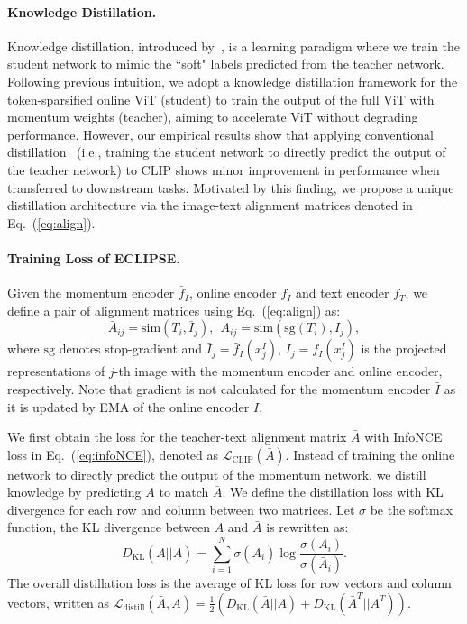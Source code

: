 \paragraph{Knowledge Distillation.}
Knowledge distillation, introduced by~\cite{hinton2015distilling}, is a learning paradigm where we train the student network to mimic the ``soft" labels predicted from the teacher network.
Following previous intuition, we adopt a knowledge distillation framework for the token-sparsified online ViT (student) to train the output of the full ViT with momentum weights (teacher), aiming to accelerate ViT without degrading performance.
However, our empirical results show that applying conventional distillation~\cite{hinton2015distilling,touvron2021training,caron2021emerging} (i.e., training the student network to directly predict the output of the teacher network) to CLIP shows minor improvement in performance when transferred to downstream tasks. %
Motivated by this finding, we propose a unique distillation architecture via the image-text alignment matrices denoted in Eq.~(\ref{eq:align}).

\paragraph{Training Loss of ECLIPSE.}
Given the momentum encoder $\bar{f}_I$, online encoder $f_I$ and text encoder $f_T$, we define a pair of alignment matrices using Eq.~(\ref{eq:align}) as:
\begin{equation}
    \bar{A}_{ij}=\mbox{sim}(T_i, \bar{I}_j), ~~A_{ij}=\mbox{sim}(\text{sg}(T_i), I_j),
\end{equation}
where $\text{sg}$ denotes stop-gradient and $\bar{I}_j=\bar{f}_I(x^I_j)$, $I_j=f_I(x^I_j)$ is the projected representations of $j$-th image with the momentum encoder and online encoder, respectively.
Note that gradient is not calculated for the momentum encoder $\bar{I}$ as it is updated by EMA of the online encoder $I$.

We first obtain the loss for the teacher-text alignment matrix $\bar{A}$ with InfoNCE loss in Eq.~(\ref{eq:infoNCE}), denoted as $\mathcal{L}_{\text{CLIP}}(\bar{A})$.
Instead of training the online network to directly predict the output of the momentum network, we distill knowledge by predicting $A$ to match $\bar{A}$.
We define the distillation loss with KL divergence for each row and column between two matrices.
Let $\sigma$ be the softmax function, the KL divergence between $A$ and $\bar{A}$ is rewritten as:
\begin{equation}
    D_{\text{KL}}(\bar A||A) = \sum_{i=1}^N \sigma(\bar A_i) \log \frac{\sigma(A_i)}{\sigma(\bar A_i)}.
\end{equation}
The overall distillation loss is the average of KL loss for row vectors and column vectors, written as $\mathcal{L}_{\text{distill}}(\bar{A},A)=\frac{1}{2}(D_{\text{KL}}(\bar A|| A) + D_{\text{KL}}(\bar A^T|| A^T))$.

